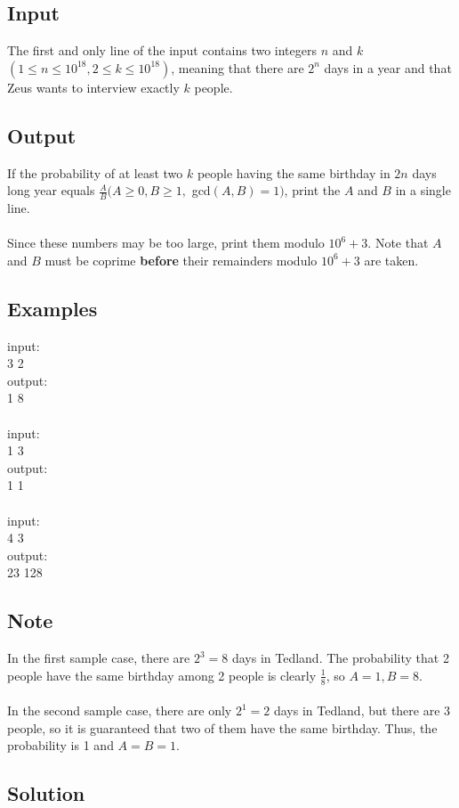 \documentclass[10pt,a4paper]{article}
\begin{document}
\begin{itemize}
\subsection*{Input}
The first and only line of the input contains two integers $n$ and $k$ $(1 \leq n\leq 10^{18},2 \leq k\leq 10^{18})$, meaning that there are $2^n$ days in a year and that Zeus wants to interview exactly $k$ people.
\subsection*{Output}
If the probability of at least two $k$ people having the same birthday in $2n$ days long year equals $\frac{A}{B}(A \geq 0, B\geq1,$ gcd$(A,B)=1)$, print the $A$ and $B$ in a single line.
\\ \\
Since these numbers may be too large, print them modulo $10^6+3$. Note that $A$ and $B$ must be coprime \textbf{before} their remainders modulo $10^6+3$ are taken.

\subsection*{Examples}
input: \\
3 2 \\
output: \\
1 8 \\
\\
input: \\
1 3 \\
output: \\
1 1 \\
\\
input: \\
4 3 \\
output: \\
23 128 

\subsection*{Note}
In the first sample case, there are $2^3=8$ days in Tedland. The probability that 2 people have the same birthday among 2 people is clearly $\frac{1}{8}$, so $A=1, B=8$.
\\ \\
In the second sample case, there are only $2^1=2$ days in Tedland, but there are 3 people, so it is guaranteed that two of them have the same birthday. Thus, the probability is 1 and $A=B=1$.

\subsection*{Solution}


\end{itemize}
\end{document}

